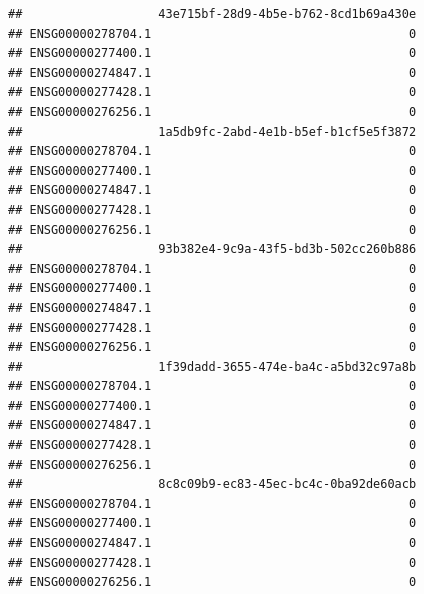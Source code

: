 \documentclass[
]{book}
\newenvironment{Shaded}{\begin{snugshade}}{\end{snugshade}}
\newcommand{\CommentTok}[1]{\textcolor[rgb]{0.56,0.35,0.01}{\textit{#1}}}
\newcommand{\DecValTok}[1]{\textcolor[rgb]{0.00,0.00,0.81}{#1}}
\newcommand{\NormalTok}[1]{#1}
\newcommand{\OtherTok}[1]{\textcolor[rgb]{0.56,0.35,0.01}{#1}}
\newcommand{\SpecialCharTok}[1]{\textcolor[rgb]{0.81,0.36,0.00}{\textbf{#1}}}
\begin{document}
\begin{Shaded}
\end{Shaded}

\begin{verbatim}
##                   43e715bf-28d9-4b5e-b762-8cd1b69a430e
## ENSG00000278704.1                                    0
## ENSG00000277400.1                                    0
## ENSG00000274847.1                                    0
## ENSG00000277428.1                                    0
## ENSG00000276256.1                                    0
##                   1a5db9fc-2abd-4e1b-b5ef-b1cf5e5f3872
## ENSG00000278704.1                                    0
## ENSG00000277400.1                                    0
## ENSG00000274847.1                                    0
## ENSG00000277428.1                                    0
## ENSG00000276256.1                                    0
##                   93b382e4-9c9a-43f5-bd3b-502cc260b886
## ENSG00000278704.1                                    0
## ENSG00000277400.1                                    0
## ENSG00000274847.1                                    0
## ENSG00000277428.1                                    0
## ENSG00000276256.1                                    0
##                   1f39dadd-3655-474e-ba4c-a5bd32c97a8b
## ENSG00000278704.1                                    0
## ENSG00000277400.1                                    0
## ENSG00000274847.1                                    0
## ENSG00000277428.1                                    0
## ENSG00000276256.1                                    0
##                   8c8c09b9-ec83-45ec-bc4c-0ba92de60acb
## ENSG00000278704.1                                    0
## ENSG00000277400.1                                    0
## ENSG00000274847.1                                    0
## ENSG00000277428.1                                    0
## ENSG00000276256.1                                    0
\end{verbatim}
\end{document}
